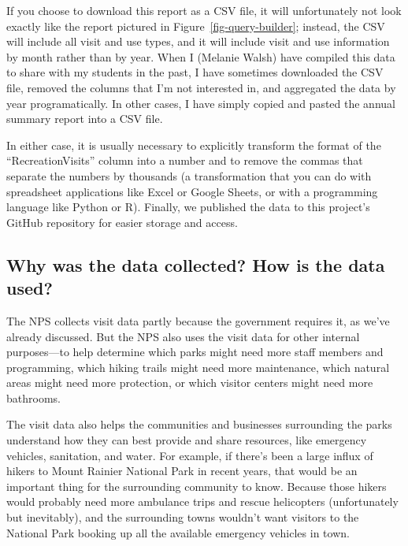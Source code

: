 \documentclass[
  letterpaper,
  DIV=11,
  numbers=noendperiod]{scrartcl}
\begin{document}
If you choose to download this report as a CSV file, it will
unfortunately not look exactly like the report pictured in
Figure~\ref{fig-query-builder}; instead, the CSV will include all visit
and use types, and it will include visit and use information by month
rather than by year. When I (Melanie Walsh) have compiled this data to
share with my students in the past, I have sometimes downloaded the CSV
file, removed the columns that I'm not interested in, and aggregated the
data by year programatically. In other cases, I have simply copied and
pasted the annual summary report into a CSV file.

In either case, it is usually necessary to explicitly transform the
format of the ``RecreationVisits'' column into a number and to remove
the commas that separate the numbers by thousands (a transformation that
you can do with spreadsheet applications like Excel or Google Sheets, or
with a programming language like Python or R). Finally, we published the
data to this project's GitHub repository for easier storage and access.

\subsection{Why was the data collected? How is the data
used?}\label{why-was-the-data-collected-how-is-the-data-used}

The NPS collects visit data partly because the government requires it,
as we've already discussed. But the NPS also uses the visit data for
other internal purposes---to help determine which parks might need more
staff members and programming, which hiking trails might need more
maintenance, which natural areas might need more protection, or which
visitor centers might need more bathrooms.

The visit data also helps the communities and businesses surrounding the
parks understand how they can best provide and share resources, like
emergency vehicles, sanitation, and water. For example, if there's been
a large influx of hikers to Mount Rainier National Park in recent years,
that would be an important thing for the surrounding community to know.
Because those hikers would probably need more ambulance trips and rescue
helicopters (unfortunately but inevitably), and the surrounding towns
wouldn't want visitors to the National Park booking up all the available
emergency vehicles in town.
\end{document}
